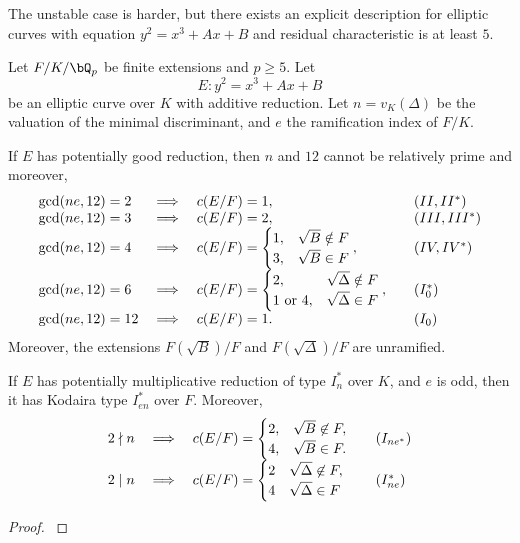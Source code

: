 The unstable case is harder, but there exists an explicit description for elliptic curves with equation $y^2=x^3+Ax+B$ and residual characteristic is at least $5$. 

\begin{lemma}\label{lem_add_tam}\label{tamagawa-num}
    Let $F /K / \bQ_p$ be finite extensions and $p \geq 5$. Let 
    $$E:  y^2 = x^3 + Ax + B$$
    be an elliptic curve over $K$ with additive reduction. Let $n=v_K(\Delta)$ be the valuation of the minimal discriminant, and $e$ the ramification index of $F/K$.

    If $E$ has potentially good reduction, then $n$ and $12$ cannot be relatively prime and moreover,
        \[
        \begin{array}{l l l l}
            \gcd(ne, 12) = 2 & \implies & c(E / F) = 1, & \quad (II, II^*) \\
            \gcd(ne, 12) = 3 & \implies & c(E / F) = 2, & \quad (III, III^*) \\
            \gcd(ne, 12) = 4 & \implies & c(E / F) = \begin{cases} 1, & \sqrt{B} \notin F
                                \\ 3, & \sqrt{B} \in F \end{cases}, & \quad (IV, IV^*) \\
            \gcd(ne, 12) = 6 & \implies & c(E / F) = \begin{cases} 2, & \sqrt{\Delta} \notin F
                \\ 1 \ \text{or} \ 4, & \sqrt{\Delta} \in F \end{cases}, & \quad (I_0^*) \\
            \gcd(ne, 12) = 12 & \implies & c(E / F) = 1. & \quad (I_0)
        \end{array}
        \]
    Moreover, the extensions $F\left(\sqrt{B}\right) / F$ and $F\left(\sqrt{\Delta}\right) / F$ are unramified.

    If $E$ has potentially multiplicative reduction of type $I_n^*$ over $K$, and $e$ is odd, then it has Kodaira type $I_{en}^*$ over $F$. Moreover, 
    \[
        \begin{array}{l l l l}
        2 \nmid n & \implies & c(E / F) = \begin{cases} 2, & \sqrt{B} \not\in F, \\ 4, & \sqrt{B} \in F. \end{cases} & \quad (I_{ne^*}) \\
        2 \mid n & \implies & c(E / F) = \begin{cases} 2 & \sqrt{\Delta} \not\in F, \\ 4 & \sqrt{\Delta} \in F \end{cases} & \quad ({I_{ne}^*})   
        \end{array} 
    \]
\end{lemma}

\begin{proof}
    \cite[Lemma 3.22]{reg-const}
\end{proof}

